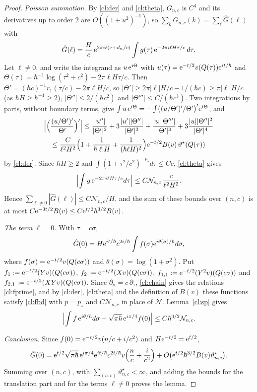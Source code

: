 \begin{proof}
\emph{Poisson summation.} By \eqref{cl:der} and \eqref{cl:theta}, $G_{n,c}$ is $C^4$ and its derivatives up to order $2$ are $O((1+u^2)^{-1})$, so
$\sum_kG_{n,c}(k)=\sum_\ell\hat G(\ell)$ with
\[
\hat G(\ell)=\frac Hc\,\mathrm{e}^{2\pi i\ell(x+d_n/c)}\int g(\tau)\,\mathrm{e}^{-2\pi i\ell H\tau/c}\,d\tau .
\]
Let $\ell\ne0$, and write the integrand as $u\,\mathrm{e}^{i\Theta}$ with $u(\tau)=\mathrm{e}^{-t/2}v(Q(\tau))\mathrm{e}^{it/\hbar}$ and
$\Theta(\tau)=\hbar^{-1}\log(\tau^2+c^2)-2\pi\ell H\tau/c$. Then $\Theta'=(\hbar c)^{-1}r_1(\tau/c)-2\pi\ell H/c$, so
$|\Theta'|\ge2\pi|\ell|H/c-1/(\hbar c)\ge\pi|\ell|H/c$ (as $\hbar H\ge\hbar^{-1}\ge2$), $|\Theta''|\le2/(\hbar c^2)$ and
$|\Theta'''|\le C/(\hbar c^3)$. Two integrations by parts, without boundary terms, give $\int u\,\mathrm{e}^{i\Theta}=-\int\bigl((u/\Theta')'/\Theta'\bigr)'\mathrm{e}^{i\Theta}$, and
\begin{multline*}
\Bigl|\Bigl(\frac{(u/\Theta')'}{\Theta'}\Bigr)'\Bigr|\le\frac{|u''|}{|\Theta'|^2}+3\frac{|u'||\Theta''|}{|\Theta'|^3}+\frac{|u||\Theta'''|}{|\Theta'|^3}+3\frac{|u||\Theta''|^2}{|\Theta'|^4}\\
\le\frac{C}{\ell^2H^2}\Bigl(1+\frac1{\hbar|\ell|H}+\frac1{(\hbar\ell H)^2}\Bigr)\mathrm{e}^{-t/2}B(v)\,\vartheta^\star(Q(\tau))
\end{multline*}
by \eqref{cl:der}. Since $\hbar H\ge2$ and $\int(1+\tau^2/c^2)^{-p_\star}d\tau\le Cc$, \eqref{cl:theta} gives
\[
\Bigl|\int g\,\mathrm{e}^{-2\pi i\ell H\tau/c}d\tau\Bigr|\le C\mathcal N_{n,c}\,\frac c{\ell^2H^2}.
\]
Hence $\sum_{\ell\ne0}|\hat G(\ell)|\le C\mathcal N_{n,c}/H$, and the sum of these bounds over $(n,c)$ is at most
$C\mathrm{e}^{-3t/2}B(v)\le C\mathrm{e}^{t/2}\hbar^{3/2}B(v)$.

\emph{The term $\ell=0$.} With $\tau=c\sigma$,
\[
\hat G(0)=H\mathrm{e}^{it/\hbar}c^{2i/\hbar}\int f(\sigma)\mathrm{e}^{i\theta(\sigma)/\hbar}d\sigma,
\]
where $f(\sigma)=\mathrm{e}^{-t/2}v(Q(c\sigma))$ and $\theta(\sigma)=\log(1+\sigma^2)$. Put $f_1:=\mathrm{e}^{-t/2}(Yv)(Q(c\sigma))$, $f_2:=\mathrm{e}^{-t/2}(Xv)(Q(c\sigma))$,
$f_{1,1}:=\mathrm{e}^{-t/2}(Y^2v)(Q(c\sigma))$ and $f_{2,1}:=\mathrm{e}^{-t/2}(XYv)(Q(c\sigma))$. Since $\partial_\sigma=c\,\partial_\tau$, \eqref{cl:chain} gives the
relations \eqref{cl:fprime}, and by \eqref{cl:der}, \eqref{cl:theta} and the definition of $B(v)$ these functions satisfy \eqref{cl:fbd} with
$p=p_\star$ and $C\mathcal N_{n,c}$ in place of $\mathcal N$. Lemma~\ref{cl:sp} gives
\[
\Bigl|\int f\,\mathrm{e}^{i\theta/\hbar}d\sigma-\sqrt{\pi\hbar}\,\mathrm{e}^{i\pi/4}f(0)\Bigr|\le C\hbar^{3/2}\mathcal N_{n,c}.
\]

\emph{Conclusion.} Since $f(0)=\mathrm{e}^{-t/2}v(n/c+i/c^2)$ and $H\mathrm{e}^{-t/2}=\mathrm{e}^{t/2}$,
\[
\hat G(0)=\mathrm{e}^{t/2}\sqrt{\pi\hbar}\,\mathrm{e}^{i\pi/4}\mathrm{e}^{it/\hbar}c^{2i/\hbar}v\Bigl(\frac nc+\frac i{c^2}\Bigr)+O\bigl(\mathrm{e}^{t/2}\hbar^{3/2}B(v)\vartheta^\star_{n,c}\bigr).
\]
Summing over $(n,c)$, with $\sum_{(n,c)}\vartheta^\star_{n,c}<\infty$, and adding the bounds for the translation part and for the terms $\ell\ne0$ proves the lemma.
\end{proof}

